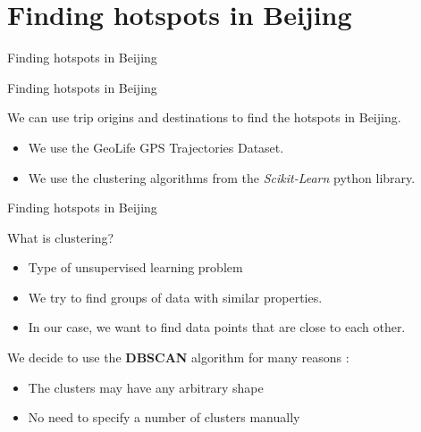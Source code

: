 \documentclass[aspectratio=169]{beamer}
\begin{document}

\section{Finding hotspots in Beijing}

\begin{frame}{Finding hotspots in Beijing}

\begin{center}
{\LARGE Finding hotspots in Beijing}
\end{center}

We can use trip origins and destinations to find the hotspots in Beijing.

\begin{itemize}
	\item We use the GeoLife GPS Trajectories Dataset.
	\item We use the clustering algorithms from the \textit{Scikit-Learn} python library\cite{pedregosa2011scikit}.
\end{itemize}
\end{frame}

\begin{frame}{Finding hotspots in Beijing}

{\Large What is clustering?}
\vspace{.5cm}

\begin{itemize}
	\item Type of unsupervised learning problem
	\item We try to find groups of data with similar properties.
	\item In our case, we want to find data points that are close to each other.
\end{itemize}
\vspace{.5cm}

We decide to use the \textbf{DBSCAN}\cite{ester1996density} algorithm for many reasons :
\begin{itemize}
	\item The clusters may have any arbitrary shape
	\item No need to specify a number of clusters manually
\end{itemize}
\end{frame}
\end{document}
